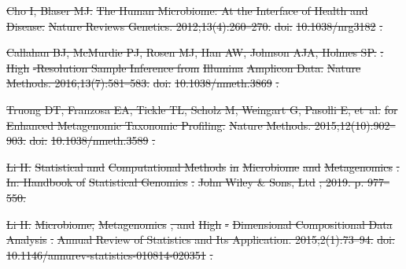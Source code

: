 \documentclass[10pt,letterpaper]{article}
\providecommand{\DIFdeltex}[1]{{\protect\color{red}\sout{#1}}}                      %
\providecommand{\DIFdel}[1]{\texorpdfstring{\DIFdeltex{#1}}{}} %
\begin{document}
\DIFdel{Cho I, Blaser MJ.
}%
\DIFdel{The Human Microbiome: At the Interface of Health and Disease.
}%
\DIFdel{Nature Reviews Genetics. 2012;13(4):260--270.
}%
\DIFdel{doi:}%
\DIFdel{10.1038/nrg3182}%
\DIFdel{.
}%

\DIFdel{Callahan BJ, McMurdie PJ, Rosen MJ, Han AW, Johnson AJA, Holmes SP.
}%
\DIFdel{: }%
\DIFdel{High}%
\DIFdel{-Resolution Sample Inference from }%
\DIFdel{Illumina}%
\DIFdel{Amplicon Data.
}%
\DIFdel{Nature Methods. 2016;13(7):581--583.
}%
\DIFdel{doi:}%
\DIFdel{10.1038/nmeth.3869}%
\DIFdel{.
}%

\DIFdel{Truong DT, Franzosa EA, Tickle TL, Scholz M, Weingart G, Pasolli E, et~al.
}%
\DIFdel{for Enhanced Metagenomic Taxonomic Profiling.
}%
\DIFdel{Nature Methods. 2015;12(10):902--903.
}%
\DIFdel{doi:}%
\DIFdel{10.1038/nmeth.3589}%
\DIFdel{.
}%

\DIFdel{Li H.
}%
\DIFdel{Statistical and }%
\DIFdel{Computational Methods}%
\DIFdel{in }%
\DIFdel{Microbiome}%
\DIFdel{and
  }%
\DIFdel{Metagenomics}%
\DIFdel{.
}%
\DIFdel{In: Handbook of }%
\DIFdel{Statistical Genomics}%
\DIFdel{. }%
\DIFdel{John Wiley \& Sons, Ltd}%
\DIFdel{;
  2019. p. 977--550.
}%

\DIFdel{Li H.
}%
\DIFdel{Microbiome, }%
\DIFdel{Metagenomics}%
\DIFdel{, and }%
\DIFdel{High}%
\DIFdel{-}%
\DIFdel{Dimensional
  Compositional Data Analysis}%
\DIFdel{.
}%
\DIFdel{Annual Review of Statistics and Its Application. 2015;2(1):73--94.
}%
\DIFdel{doi:}%
\DIFdel{10.1146/annurev-statistics-010814-020351}%
\DIFdel{.
}%
\end{document}
